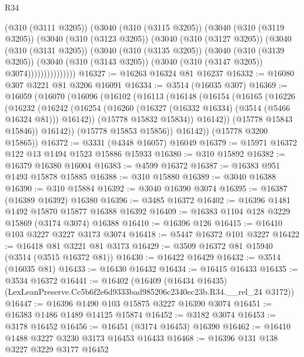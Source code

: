 \begin{lexlean}{R34}
\begin{coremodule}
                (@310 (@3111 @3205))
                (@3040
                  (@310 (@3115 @3205))
                  (@3040
                    (@310 (@3119 @3205))
                    (@3040
                      (@310 (@3123 @3205))
                      (@3040
                        (@310 (@3127 @3205))
                        (@3040
                          (@310 (@3131 @3205))
                          (@3040
                            (@310 (@3135 @3205))
                            (@3040
                              (@310 (@3139 @3205))
                              (@3040
                                (@310 (@3143 @3205))
                                (@3040 (@310 (@3147 @3205)) @3074)))))))))))))))
@16327 := @16263 @16324 @81 @16237
@16332 := @16080 @307 @3221 @81 @3206 @16091
@16334 := @3514 (@16035 @307)
@16369 := @16059
    (@16070
      (@16096
        (@16102
          (@16113
            (@16148
              (@16154
                (@16165
                  (@16226
                    (@16232
                      (@16242
                        (@16254 (@16260 (@16327 (@16332 @16334) (@3514 (@5466 @16324 @81))) @16142))
                        (@15778 @15832 @15834))
                      @16142))
                  (@15778 @15843 @15846))
                @16142))
            (@15778 @15853 @15856))
          @16142))
      (@15778 @3200 @15865))
@16372 := @3331 (@4348 @16057) @16049
@16379 := @15971 @16372 @122 @13 @1494 @1523 @15886 @15933
@16380 := @310 @15892
@16382 := @16379 @16380 @16004
@16383 := @4599 @16372
@16387 := @16383 @951 @1493 @15878 @15885
@16388 := @310 @15880
@16389 := @3040 @16388
@16390 := @310 @15884
@16392 := @3040 @16390 @3074
@16395 := @16387 (@16389 @16392) @16380
@16396 := @3485 @16372
@16402 := @16396 @1481 @1492 @15870 @15877 @16388 @16392
@16409 := @16383 @1104 @128 @3229 @15869 (@3174 @3074) @16388
@16410 := @16396 @126
@16415 := @16410 @103 @3227 @3227 @3173 @3074
@16418 := @5447 @16372 @101 @3227
@16422 := @16418 @81 @3221 @81 @3173
@16429 := @3509 @16372 @81 @15940 (@3514 (@3515 @16372 @81))
@16430 := @16422 @16429
@16432 := @3514 (@16035 @81)
@16433 := @16430 @16432
@16434 := @16415 @16433
@16435 := @3534 @16372
@16441 := @16402
    (@16409 (@16434 @16435) (LexLeanPreserve.Cc5b6f2e6d9333bad985206c2340ec23b.R34.__rel_24 @3172))
@16447 := @16396 @1490 @103 @15875 @3227 @16390 @3074
@16451 := @16383 @1486 @1489 @14125 @15874
@16452 := @3182 @3074
@16453 := @3178 @16452
@16456 := @16451 (@3174 @16453) @16390
@16462 := @16410 @1488 @3227 @3230 @3173 @16453 @16433
@16468 := @16396 @131 @138 @3227 @3229 @3177 @16452

\end{coremodule}
\end{lexlean}
